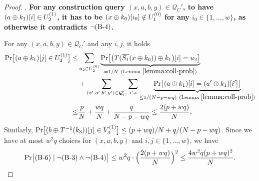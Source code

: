 \begin{proof}
%



\arrangespace

\noindent \textsc{\bsix}. \textbf{For any construction query $(x,a,b,y)\in\mathcal{Q}_C'$, to have $(a\oplus k_1)[i]\in U_2^{(1)}$, it has to be $(x\oplus k_0)[i_0]\notin U_1^{(0)}$ for any $i_0\in\{1,\ldots,w\}$, as otherwise it contradicts $\neg\text{(B-4)}$.}


For any $(x,a,b,y)\in\mathcal{Q}_C'$ and any $i,j$, it holds
%
\begin{align}
{\Pr}\big[(a\oplus k_1)[j]\in U_2^{(1)}\big] \leq  &  \sum_{u_2\in U_2^{(0)}}  \underbrace{{\Pr}\big[\big(T(\overline{S_1}(x\oplus k_0))\oplus k_1\big)[i]=u_2\big]}_{=1/N\ (\text{Lemma }\ref{lemma:coll-prob})}       \notag        \\
& +
\sum_{(x',a',b',y')\in\mathcal{Q}_C'}\sum_{i',i} \underbrace{{\Pr}\big[(a\oplus k_1)[i]=(a'\oplus k_1)[i']\big]}_{\leq1/(N-p-wq)\ (\text{Lemma }\ref{lemma:coll-prob})}         \notag      \\
\leq  &  \frac{p}{N}+\frac{wq}{N}+\frac{q}{N-p-wq} \leq \frac{2(p+wq)}{N}.
\notag
\end{align}
Similarly, ${\Pr}\big[(b\oplus T^{-1}(k_3))[j]\in V_3^{(1)}\big]\leq(p+wq)/N+q/(N-p-wq)$. Since we have at most $w^2q$ choices for $(x,a,b,y)$ and $i, j \in\{1, \ldots, w\}$, we have
%
$$
{\Pr}\big[\text{(B-6)}\mid\neg\text{(B-3)}\wedge\neg\text{(B-4)}\big] \leq
w^2q\cdot\Big(\frac{2(p+wq)}{N}\Big)^2\leq \frac{4w^2q(p+wq)^2}{N}.
$$



\end{proof}
